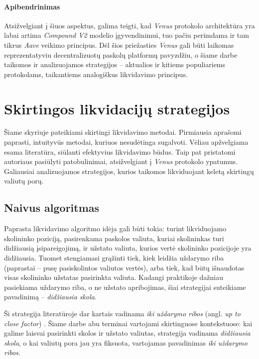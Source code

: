 \documentclass[]{VUMIFTemplateClass}
\begin{document}
\paragraph{Apibendrinimas}

Atsižvelgiant į šiuos aspektus, galima teigti, kad \textit{Venus} protokolo architektūra yra labai artima \textit{Compound V2} modelio įgyvendinimui, tuo pačiu perimdama ir tam tikrus \textit{Aave} veikimo principus. Dėl šios priežasties \textit{Venus} gali būti laikomas reprezentatyviu decentralizuotų paskolų platformų pavyzdžiu, o šiame darbe taikomos ir analizuojamos strategijos – aktualios ir kitiems populiariems protokolams, taikantiems analogiškus likvidavimo principus.

\section{Skirtingos likvidacijų strategijos}
\label{sec:liq_strategijos}

Šiame skyriuje pateikiami skirtingi likvidavimo metodai. Pirmiausia aprašomi paprasti, intuityvūs metodai, kuriuos nesudėtinga sugalvoti. Vėliau apžvelgiama esama literatūra, siūlanti efektyvius likvidavimo būdus. Taip pat pristatomi autoriaus pasiūlyti patobulinimai, atsižvelgiant į \textit{Venus} protokolo ypatumus. Galiausiai analizuojamos strategijos, kurios taikomos likviduojant keletą skirtingų valiutų porų.

\subsection{Naivus algoritmas}
\label{sec:largest_borrow}

Paprasta likvidavimo algoritmo idėja gali būti tokia: turint likviduojamo skolininko poziciją, pasirenkama paskolos valiuta, kuriai skolininkas turi didžiausią įsipareigojimą, ir užstato valiuta, kurios vertė skolininko pozicijoje yra didžiausia. Tuomet stengiamasi grąžinti tiek, kiek leidžia uždarymo riba (paprastai – pusę pasiskolintos valiutos vertės), arba tiek, kad būtų išnaudotas visas skolininko užstatas pasirinkta valiuta. Kadangi praktikoje dažniau pasiekiama uždarymo riba, o ne užstato apribojimas, šiai strategijai suteikiame pavadinimą – \textit{didžiausia skola}.

Ši strategija literatūroje dar kartais vadinama \textit{iki uždarymo ribos} (angl. \textit{up to close factor}) \cite{Emp}. Šiame darbe abu terminai vartojami skirtinguose kontekstuose: kai galime laisvai pasirinkti skolos ir užstato valiutas, strategija vadinama \textit{didžiausia skola}, o kai valiutų pora jau yra fiksuota, vartojamas pavadinimas \textit{iki uždarymo ribos}.
\end{document}
